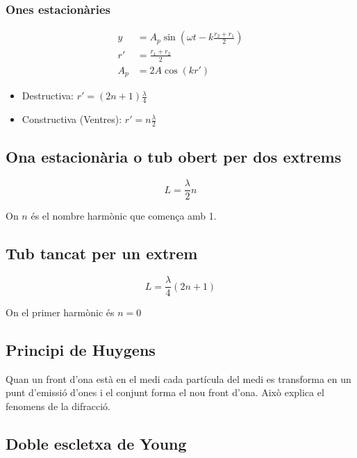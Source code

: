 \subsubsection{Ones estacionàries}
\label{ssub:ones_estacionaries}

\begin{align}
    y &= A_p\sin\left( \omega t -k \frac{r_2+r_1}{2} \right) \\
    r' &= \frac{r_1+r_2}{2} \\
    A_p &= 2A\cos\left( kr' \right)
\end{align}

\begin{itemize}
    \item Destructiva: $r' = (2n+1)\frac{\lambda}{4}$
    \item Constructiva (Ventres): $r' = n\frac{\lambda}{2}$
\end{itemize}

\subsection{Ona estacionària o tub obert per dos extrems}
\label{sub:ona_estacionaria_o_tub_obert_per_dos_extrems}

\begin{equation}
    L = \frac{\lambda}{2}n
\end{equation}

On $n$ és el nombre harmònic que comença amb 1.

\subsection{Tub tancat per un extrem}
\label{sub:tub_tancat_per_un_extrem}

\begin{equation}
    L = \frac{\lambda}{4}(2n+1)
\end{equation}

On el primer harmònic és $n=0$

\subsection{Principi de Huygens}
\label{sub:principi_de_huygens}

Quan un front d'ona està en el medi cada partícula del medi es transforma en
un punt d'emissió d'ones i el conjunt forma el nou front d'ona. Això explica el
fenomens de la difracció.

\subsection{Doble escletxa de Young}
\label{sub:doble_escletxa_de_young}

